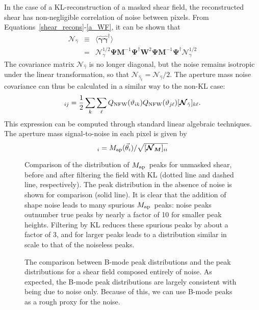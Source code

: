 \documentclass[twocolumn]{emulateapj}
\newcommand{\myvec}[1]{\boldsymbol{#1}}
\newcommand{\mymat}[1]{\boldsymbol{#1}}
\newcommand{\Map}{\ensuremath{M_{\rm ap}}\ }
\newcommand{\Noise}{\mymat{\mathcal{N}}}
\begin{document}
In the case of a KL-reconstruction of a masked shear field, the reconstructed
shear has non-negligible correlation of noise between pixels.  
From Equations~\ref{shear_recons}-\ref{a_WF}, it can be shown that
\begin{eqnarray}
  \Noise_{\hat\gamma} 
  & \equiv  &
  \langle\myvec{\hat\gamma} \myvec{\hat\gamma}^\dagger\rangle\nonumber\\
  & = & \Noise_\gamma^{1/2}\myvec\Psi \mymat{M}^{-1} \mymat{\Psi}^\dagger \mymat{W}^2 \mymat{\Psi} \mymat{M}^{-1} \mymat{\Psi}^\dagger \Noise_\gamma^{1/2}
\end{eqnarray}
The covariance matrix $\Noise_{\hat\gamma}$ is no longer diagonal, but
the noise remains isotropic under the linear transformation, so that
$\Noise_{\hat{\gamma}_t} = \Noise_{\hat{\gamma}}/2$.
The aperture mass noise covariance can thus be calculated in a similar 
way to the non-KL case:
\begin{equation}
  [\Noise_M]_{ij} = \frac{1}{2}\sum_k\sum_\ell Q_{\rm NFW}(\vartheta_{ik})
  Q_{\rm NFW}(\vartheta_{j\ell}) [\Noise_{\hat\gamma}]_{k\ell}.
\end{equation}
This expression can be computed through standard linear algebraic techniques.  
The aperture mass signal-to-noise in each pixel is given by 
\begin{equation}
  [S/N]_i = M_{\rm ap}(\vec\theta_i)/\sqrt{[\mymat{\Noise_M}]_{ii}}
\end{equation}

\begin{figure}
 \centering
 \caption{
   Comparison of the distribution of \Map peaks for unmasked shear,
   before and after filtering
   the field with KL (dotted line and dashed line, respectively).  The
   peak distribution in the absence of noise is shown for comparison
   (solid line).  It is clear that the addition of shape noise leads to 
   many spurious \Map peaks: noise peaks outnumber true peaks by nearly a
   factor of 10 for smaller peak heights.  Filtering by KL reduces these
   spurious peaks by about a factor of 3, and for larger peaks leads
   to a distribution similar in scale to that of the noiseless peaks.
   \label{fig_num_peaks}  
 } 
\end{figure}

\begin{figure}
 \centering
 \caption{The comparison between B-mode peak distributions and the
   peak distributions for a shear field composed entirely of noise.
   As expected, the B-mode peak distributions are largely consistent
   with being due to noise only.  Because of this, we can use B-mode
   peaks as a rough proxy for the noise.
   \label{fig_B_noise} 
 }
\end{figure}
\end{document}
